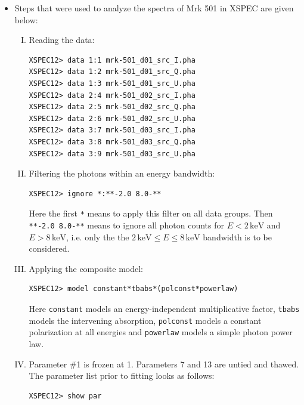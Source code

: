     \begin{itemize}
        \item Steps that were used to analyze the spectra of Mrk 501 in XSPEC are given below:
        \begin{enumerate}[I.]
        	\item Reading the data:
        	\begin{verbatim}
XSPEC12> data 1:1 mrk-501_d01_src_I.pha
XSPEC12> data 1:2 mrk-501_d01_src_Q.pha
XSPEC12> data 1:3 mrk-501_d01_src_U.pha
XSPEC12> data 2:4 mrk-501_d02_src_I.pha
XSPEC12> data 2:5 mrk-501_d02_src_Q.pha
XSPEC12> data 2:6 mrk-501_d02_src_U.pha
XSPEC12> data 3:7 mrk-501_d03_src_I.pha
XSPEC12> data 3:8 mrk-501_d03_src_Q.pha
XSPEC12> data 3:9 mrk-501_d03_src_U.pha
        	\end{verbatim}
        	
        	\item Filtering the photons within an energy bandwidth:
        	\begin{verbatim}
XSPEC12> ignore *:**-2.0 8.0-**
        	\end{verbatim}
        	Here the first \verb|*| means to apply this filter on all data groups. Then \verb|**-2.0 8.0-**| means to ignore all photon counts for $E<\num{2}\,\unit{\kilo\eV}$ and $E>\num{8}\,\unit{\kilo\eV}$, i.e. only the the $\num{2}\,\unit{\kilo\eV}\leqslant E\leqslant\num{8}\,\unit{\kilo\eV}$ bandwidth is to be considered.
        	
        	\item Applying the composite model:
        	\begin{verbatim}
XSPEC12> model constant*tbabs*(polconst*powerlaw)
        	\end{verbatim}
        	Here \verb*|constant| models an energy-independent multiplicative factor, \verb|tbabs| models the intervening absorption, \verb|polconst| models a constant polarization at all energies and \verb|powerlaw| models a simple photon power law.
        	
        	\item Parameter \#1 is frozen at 1. Parameters 7 and 13 are untied and thawed. The parameter list prior to fitting looks as follows:
        	\begin{verbatim}
XSPEC12> show par


\end{verbatim}
\end{enumerate}
\end{itemize}
